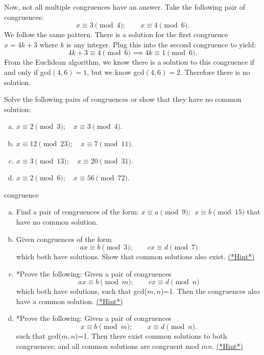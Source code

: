 Now, not all multiple congruences have an answer.  Take the following pair of congruences:
\[x \equiv 3 \pmod 4; \qquad x \equiv 4 \pmod 6.\]
We follow the same pattern.  There is a solution for the first congruence $x = 4k + 3$ where $k$ is any integer.  Plug this into the second congruence to yield:
\[4k + 3 \equiv 4 \pmod 6 \implies 4k \equiv 1 \pmod 6.\]
From the Euclidean algorithm, we know there is a solution to this congruence if and only if gcd$(4,6) = 1$, but we know gcd$(4,6) = 2$.  Therefore there is no solution.  


\begin{exercise}{91}
Solve the following pairs of congruences or show that they have no common solution:
\begin{enumerate}[(a)]
\item
$x \equiv 2 \pmod{3}; \quad x \equiv 3 \pmod{4}.$
\item
$x \equiv 12 \pmod{23}; \quad x \equiv 7 \pmod{11}.$
\item
$x \equiv 3 \pmod{13}; \quad x \equiv 20 \pmod{31}.$
\item
$x \equiv 2 \pmod{6}; \quad  x \equiv 56 \pmod{72}.$
\end {enumerate}
\end {exercise}

\begin{exercise}{congruence}
\begin{enumerate}[(a)]
\item
Find a pair of congruences of the form: $x \equiv a \pmod{9};~~x \equiv b \pmod{15}$ that have no common solution.
\item
Given congruences of the form 
\[ ax \equiv b \pmod{3}; \qquad cx \equiv d \pmod{7} \]
which both have solutions.  Show that  common solutions also exist.
 \hyperref[sec:modular_arithmetic:hints]{(*Hint*)}
\item
*Prove the following: Given a pair of congruences
\[ ax \equiv b \pmod{m}; \qquad cx \equiv d \pmod{n} \]
 which both have solutions, such that gcd($m,n$)=1. Then the congruences also have a common solution.
 \hyperref[sec:modular_arithmetic:hints]{(*Hint*)}
\item
*Prove the following: Given a pair of congruences
\[ x \equiv b \pmod{m}; \qquad x \equiv d \pmod{n}. \]
 such that gcd($m,n$)=1. Then there exist common solutions to both congruences; and all common solutions are congruent mod $mn$.
 \hyperref[sec:modular_arithmetic:hints]{(*Hint*)}
\end{enumerate}
\end{exercise}


